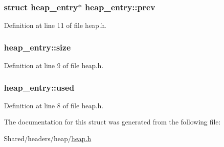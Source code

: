 \hypertarget{structheap__entry_a9fbde1b1963b161058f5e1319a166672}{
\subsubsection[{prev}]{\setlength{\rightskip}{0pt plus 5cm}struct {\bf heap\_\-entry}$\ast$ {\bf heap\_\-entry::prev}}}
\label{structheap__entry_a9fbde1b1963b161058f5e1319a166672}


Definition at line 11 of file heap.h.

\hypertarget{structheap__entry_a9133349c98d74429e7e8441d88e08cd6}{
\subsubsection[{size}]{ {\bf heap\_\-entry::size}}}
\label{structheap__entry_a9133349c98d74429e7e8441d88e08cd6}


Definition at line 9 of file heap.h.

\hypertarget{structheap__entry_ac671a08602b18399f8b21ebacc46fe6a}{
\subsubsection[{used}]{ {\bf heap\_\-entry::used}}}
\label{structheap__entry_ac671a08602b18399f8b21ebacc46fe6a}


Definition at line 8 of file heap.h.



The documentation for this struct was generated from the following file:\begin{DoxyCompactItemize}
\item 
Shared/headers/heap/\hyperlink{heap_8h}{heap.h}\end{DoxyCompactItemize}
